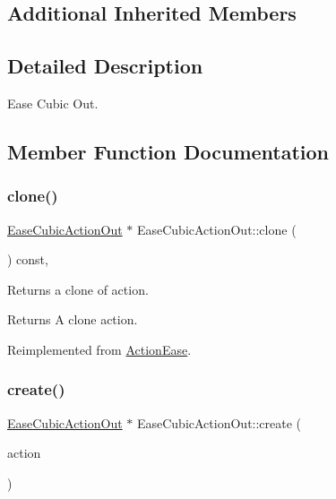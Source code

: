 \subsection*{Additional Inherited Members}


\subsection{Detailed Description}
Ease Cubic Out. 

\subsection{Member Function Documentation}
\mbox{\label{classEaseCubicActionOut_a477348e29bfcbe3bfd4766398aaefed8}} 
\subsubsection{\texorpdfstring{clone()}{clone()}}
{\footnotesize\ttfamily \hyperlink{classEaseCubicActionOut}{Ease\+Cubic\+Action\+Out} $\ast$ Ease\+Cubic\+Action\+Out\+::clone (\begin{DoxyParamCaption}\item[{void}]{ }\end{DoxyParamCaption}) const\hspace{0.3cm}{\ttfamily [override]}, {\ttfamily [virtual]}}

Returns a clone of action.

\begin{DoxyReturn}{Returns}
A clone action. 
\end{DoxyReturn}


Reimplemented from \hyperlink{classActionEase_a39bec93fe161fb732a74d8e51a2fe08b}{Action\+Ease}.

\mbox{\label{classEaseCubicActionOut_a32183dafa37c3fd06f59fa9b567dba38}} 
\subsubsection{\texorpdfstring{create()}{create()}}
{\footnotesize\ttfamily \hyperlink{classEaseCubicActionOut}{Ease\+Cubic\+Action\+Out} $\ast$ Ease\+Cubic\+Action\+Out\+::create (\begin{DoxyParamCaption}\item[{\hyperlink{classActionInterval}{Action\+Interval} $\ast$}]{action }\end{DoxyParamCaption})\hspace{0.3cm}{\ttfamily [static]}}



